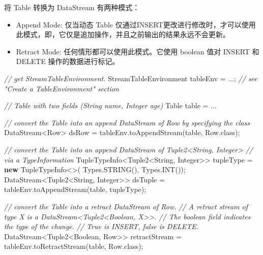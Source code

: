 \documentclass[cn,11pt,chinese]{elegantbook}
\newenvironment{Shaded}{}{}
\newcommand{\BuiltInTok}[1]{#1}
\newcommand{\CommentTok}[1]{\textcolor[rgb]{0.38,0.63,0.69}{\textit{#1}}}
\newcommand{\FunctionTok}[1]{\textcolor[rgb]{0.02,0.16,0.49}{#1}}
\newcommand{\KeywordTok}[1]{\textcolor[rgb]{0.00,0.44,0.13}{\textbf{#1}}}
\newcommand{\NormalTok}[1]{#1}
\providecommand{\tightlist}{%
  \setlength{\itemsep}{0pt}\setlength{\parskip}{0pt}}
\begin{document}
将 Table 转换为 DataStream 有两种模式：

\begin{itemize}
\tightlist
\item
  Append Mode: 仅当动态 Table
  仅通过INSERT更改进行修改时，才可以使用此模式，即，它仅是追加操作，并且之前输出的结果永远不会更新。
\item
  Retract Mode: 任何情形都可以使用此模式。它使用 boolean 值对 INSERT 和
  DELETE 操作的数据进行标记。
\end{itemize}

\begin{Shaded}
\begin{Highlighting}[]
\CommentTok{// get StreamTableEnvironment. }
\NormalTok{StreamTableEnvironment tableEnv = ...; }\CommentTok{// see "Create a TableEnvironment" section}

\CommentTok{// Table with two fields (String name, Integer age)}
\NormalTok{Table table = ...}

\CommentTok{// convert the Table into an append DataStream of Row by specifying the class}
\NormalTok{DataStream\textless{}Row\textgreater{} dsRow = tableEnv.}\FunctionTok{toAppendStream}\NormalTok{(table, Row.}\FunctionTok{class}\NormalTok{);}

\CommentTok{// convert the Table into an append DataStream of Tuple2\textless{}String, Integer\textgreater{} }
\CommentTok{//   via a TypeInformation}
\NormalTok{TupleTypeInfo\textless{}Tuple2\textless{}}\BuiltInTok{String}\NormalTok{, }\BuiltInTok{Integer}\NormalTok{\textgreater{}\textgreater{} tupleType = }\KeywordTok{new}\NormalTok{ TupleTypeInfo\textless{}\textgreater{}(}
  \BuiltInTok{Types}\NormalTok{.}\FunctionTok{STRING}\NormalTok{(),}
  \BuiltInTok{Types}\NormalTok{.}\FunctionTok{INT}\NormalTok{());}
\NormalTok{DataStream\textless{}Tuple2\textless{}}\BuiltInTok{String}\NormalTok{, }\BuiltInTok{Integer}\NormalTok{\textgreater{}\textgreater{} dsTuple = }
\NormalTok{  tableEnv.}\FunctionTok{toAppendStream}\NormalTok{(table, tupleType);}

\CommentTok{// convert the Table into a retract DataStream of Row.}
\CommentTok{//   A retract stream of type X is a DataStream\textless{}Tuple2\textless{}Boolean, X\textgreater{}\textgreater{}. }
\CommentTok{//   The boolean field indicates the type of the change. }
\CommentTok{//   True is INSERT, false is DELETE.}
\NormalTok{DataStream\textless{}Tuple2\textless{}}\BuiltInTok{Boolean}\NormalTok{, Row\textgreater{}\textgreater{} retractStream = }
\NormalTok{  tableEnv.}\FunctionTok{toRetractStream}\NormalTok{(table, Row.}\FunctionTok{class}\NormalTok{);}
\end{Highlighting}
\end{Shaded}
\end{document}
